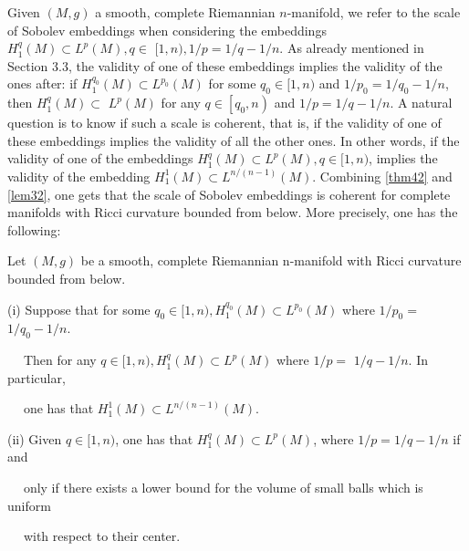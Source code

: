\documentclass[12pt,hyperref,a4paper,UTF8]{ctexart}
\begin{document}
\vskip 3pt
Given $(M, g)$ a smooth, complete Riemannian $n$-manifold, we refer to the scale of Sobolev embeddings when considering the embeddings $H_1^q(M) \subset L^p(M), q \in$ $[1, n), 1 / p=1 / q-1 / n$. As already mentioned in Section 3.3, the validity of one of these embeddings implies the validity of the ones after: if
$H_1^{q_0}(M) \subset L^{p_0}(M)$ for some $q_0 \in[1, n)$ and $1 / p_0=1 / q_0-1 / n$, then $H_1^q(M) \subset$ $L^p(M)$ for any $q \in\left[q_0, n\right)$ and $1 / p=1 / q-1 / n$. A natural question is to know if such a scale is coherent, that is, if the validity of one of these embeddings implies the validity of all the other ones. 
In other words, if the validity of one of the embeddings $H_1^q(M) \subset L^p(M), q \in[1, n)$, implies the validity of the embedding $H_1^1(M) \subset L^{n /(n-1)}(M)$. Combining \autoref{thm42} and \autoref{lem32}, one gets that the scale of Sobolev embeddings is coherent for complete manifolds with Ricci curvature bounded from below. More precisely, one has the following:

\begin{Theorem}
Let $(M, g)$ be a smooth, complete Riemannian n-manifold with Ricci curvature bounded from below.

(i) Suppose that for some $q_0 \in[1, n), H_1^{q_0}(M) \subset L^{p_0}(M)$ where $1 / p_0=$ $1 / q_0-1 / n$. 

$\quad\;$Then for any $q \in[1, n), H_1^q(M) \subset L^p(M)$ where $1 / p=$ $1 / q-1 / n$. In particular, 

$\quad\;$one has that $H_1^{1}(M) \subset L^{n /(n-1)}(M)$.

(ii) Given $q \in[1, n)$, one has that $H_1^q(M) \subset L^p(M)$, where $1 / p=1 / q-1 / n$ if and 

$\quad\;$only if there exists a lower bound for the volume of small balls which is uniform 

$\quad\;$with respect to their center.
\label{thm43}
\end{Theorem}
\end{document}
